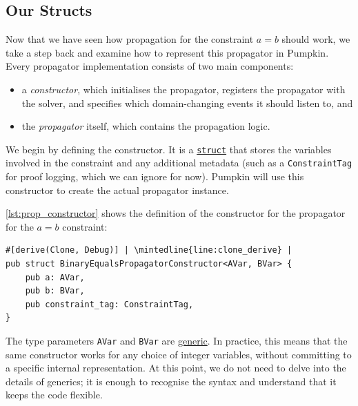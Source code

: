 \documentclass{article}
\begin{document}
\subsection{Our Structs}

Now that we have seen how propagation for the constraint $a = b$ should work, we take a step back and examine how to represent this propagator in Pumpkin.
Every propagator implementation consists of two main components:

\begin{itemize}
    \item a \emph{constructor}, which initialises the propagator, registers the propagator with the solver, and specifies which domain-changing events it should listen to, and
    \item the \emph{propagator} itself, which contains the propagation logic.
\end{itemize}

We begin by defining the constructor.
It is a \href{https://doc.rust-lang.org/book/ch05-00-structs.html}{\texttt{struct}} that stores the variables involved in the constraint and any additional metadata (such as a \texttt{ConstraintTag} for proof logging, which we can ignore for now).
Pumpkin will use this constructor to create the actual propagator instance.

\autoref{lst:prop_constructor} shows the definition of the constructor for the propagator for the $a = b$ constraint:

\begin{listing}[H]
\begin{verbatim}
#[derive(Clone, Debug)] | \mintedline{line:clone_derive} |
pub struct BinaryEqualsPropagatorConstructor<AVar, BVar> {
    pub a: AVar,
    pub b: BVar,
    pub constraint_tag: ConstraintTag,
}
\end{verbatim}
\caption{The \texttt{BinaryEqualsPropagatorConstructor} struct}
\label{lst:prop_constructor}
\end{listing}

The type parameters \texttt{AVar} and \texttt{BVar} are \href{https://doc.rust-lang.org/book/ch10-01-syntax.html}{generic}.
In practice, this means that the same constructor works for any choice of integer variables, without committing to a specific internal representation. 
At this point, we do not need to delve into the details of generics; it is enough to recognise the syntax and understand that it keeps the code flexible.
\end{document}
